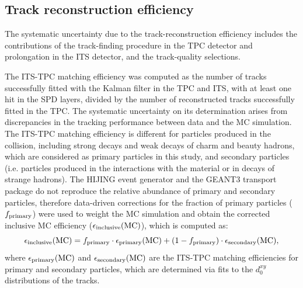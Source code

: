 

\clearpage
\subsection{Track reconstruction efficiency}

The systematic uncertainty due to the track-reconstruction efficiency includes the contributions of the track-finding procedure in the TPC detector and prolongation in the ITS detector, and the track-quality selections. 

The ITS-TPC matching efficiency was computed as the number of tracks successfully fitted with the Kalman filter in the TPC and ITS, with at least one hit in the SPD layers, divided by the number of reconstructed tracks successfully fitted in the TPC. The systematic uncertainty on its determination arises from discrepancies in the tracking performance between data and the MC simulation. The ITS-TPC matching efficiency is different for particles produced in the collision, including strong decays and weak decays of charm and beauty hadrons, which are considered as primary particles in this study, and secondary particles (i.e. particles produced in the interactions with the material or in decays of strange hadrons). The HIJING event generator and the GEANT3 transport package do not reproduce the relative abundance of primary and secondary particles, therefore data-driven corrections for the fraction of primary particles ($f_{\rm primary}$) were used to weight the MC simulation and obtain the corrected inclusive MC efficiency ($\epsilon_{\rm inclusive}({\rm MC})$), which is computed as:
\begin{equation}
	\epsilon_{\rm inclusive}({\rm MC}) = f_{\rm primary}\cdot\epsilon_{\rm primary}({\rm MC})+(1-f_{\rm primary})\cdot\epsilon_{\rm secondary}({\rm MC}),
\end{equation}
where $\epsilon_{\rm primary}({\rm MC})$ and $\epsilon_{\rm secondary}({\rm MC})$ are the ITS-TPC matching efficiencies for primary and secondary particles, which are determined via fits to the $d_0^{xy}$ distributions of the tracks. 

